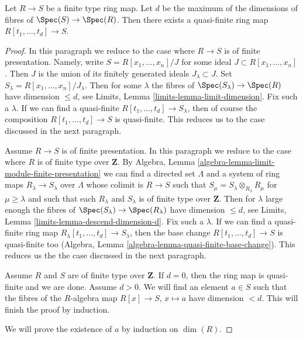 \begin{lemma}
\label{lemma-weak-relative-noether-normalization}
Let $R \to S$ be a finite type ring map. Let $d$ be the maximum
of the dimensions of fibres of $\Spec(S) \to \Spec(R)$.
Then there exists a quasi-finite ring map
$R[t_1, \ldots, t_d] \to S$.
\end{lemma}

\begin{proof}
In this paragraph we reduce to the case where $R \to S$ is of finite
presentation. Namely, write $S = R[x_1, \ldots, x_n]/J$ for some ideal
$J \subset R[x_1, \ldots, x_n]$.
Then $J$ is the union of its finitely generated ideals $J_\lambda \subset J$.
Set $S_\lambda = R[x_1, \ldots, x_n]/J_\lambda$.
Then for some $\lambda$ the fibres of
$\Spec(S_\lambda) \to \Spec(R)$
have dimension $\leq d$, see Limits, Lemma \ref{limits-lemma-limit-dimension}.
Fix such a $\lambda$. If we can find a quasi-finite
$R[t_1, \ldots, t_d] \to S_\lambda$, then of course the composition
$R[t_1, \ldots, t_d] \to S$ is quasi-finite.
This reduces us to the case discussed in the next paragraph.

\medskip\noindent
Assume $R \to S$ is of finite presentation. In this paragraph we reduce
to the case where $R$ is of finite type over $\mathbf{Z}$. By
Algebra, Lemma \ref{algebra-lemma-limit-module-finite-presentation}
we can find a directed set $\Lambda$ and a system of ring maps
$R_\lambda \to S_\lambda$ over $\Lambda$ whose colimit is
$R \to S$ such that $S_\mu = S_\lambda \otimes_{R_\lambda} R_\mu$
for $\mu \geq \lambda$ and
such that each $R_\lambda$ and $S_\lambda$ is of finite
type over $\mathbf{Z}$.
Then for $\lambda$ large enough the fibres of
$\Spec(S_\lambda) \to \Spec(R_\lambda)$
have dimension $\leq d$, see
Limits, Lemma \ref{limits-lemma-descend-dimension-d}.
Fix such a $\lambda$. If we can find a quasi-finite ring map
$R_\lambda[t_1, \ldots, t_d] \to S_\lambda$, then the base change
$R[t_1, \ldots, t_d] \to S$ is quasi-finite too
(Algebra, Lemma \ref{algebra-lemma-quasi-finite-base-change}).
This reduces us the the case discussed in the next paragraph.

\medskip\noindent
Assume $R$ and $S$ are of finite type over $\mathbf{Z}$. If $d = 0$, then
the ring map is quasi-finite and we are done. Assume $d > 0$.
We will find an element $a \in S$ such that
the fibres of the $R$-algebra map $R[x] \to S$, $x \mapsto a$
have dimension $< d$. This will finish the proof by induction.

\medskip\noindent
We will prove the existence of $a$ by induction on $\dim(R)$.


\end{proof}
